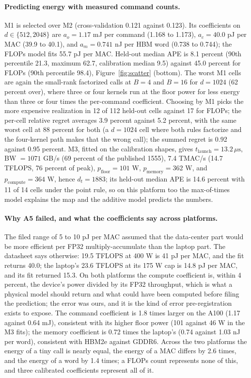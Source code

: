 \documentclass{article}
\newcommand{\us}{\,\mu\mathrm{s}}
\begin{document}
\paragraph{Predicting energy with measured command counts.} M1 is selected over M2 (cross-validation 0.121 against 0.123). Its coefficients on $d \in \{512, 2048\}$ are $a_o = 1.17$ mJ per command (1.168 to 1.173), $a_c = 40.0$ pJ per MAC (39.9 to 40.1), and $a_m = 0.741$ nJ per HBM word (0.738 to 0.744); the FLOPs model fits 55.7 pJ per MAC. Held-out median APE is 8.1 percent (90th percentile 21.3, maximum 62.7, calibration median 9.5) against 45.0 percent for FLOPs (90th percentile 98.4), Figure~\ref{fig:scatter} (bottom). The worst M1 cells are again the small-rank factorized calls at $B = 4$ and $B = 16$ for $d = 1024$ (62 percent over), where three or four kernels run at the floor power for less energy than three or four times the per-command coefficient. Choosing by M1 picks the more expensive realization in 12 of 112 held-out cells against 17 for FLOPs; the per-cell relative regret averages 3.9 percent against 5.2 percent, with the same worst cell at 88 percent for both (a $d = 1024$ cell where both rules factorize and the four-kernel path makes that the wrong call); the summed regret is 0.92 against 0.95 percent. M3, fitted on the calibration shapes, gives $t_{\mathrm{launch}} = 13.2\us$, BW $= 1071$ GB/s (69 percent of the published 1555), 7.4 TMAC/s (14.7 TFLOPS, 76 percent of peak), $p_{\mathrm{floor}} = 101$ W, $p_{\mathrm{memory}} = 362$ W, and $p_{\mathrm{compute}} = 364$ W, hence $d_t = 1883$; its held-out median APE is 14.6 percent with 11 of 14 cells under the point rule, so on this platform too the max-of-times model explains the map and the additive model predicts the numbers.

\paragraph{Why A5 failed, and what the coefficients say across platforms.} The filed range of 5 to 10 pJ per MAC assumed that the data-center part would be more efficient per FP32 multiply-accumulate than the laptop part. The datasheet says otherwise: 19.5 TFLOPS at 400 W is 41 pJ per MAC, and the fit returns 40.0; the laptop's 23.6 TFLOPS at its 175 W cap is 14.8 pJ per MAC, and its fit returned 15.3. On both platforms the compute coefficient is, within 4 percent, the device's power divided by its FP32 throughput, which is what a physical model should return and what could have been computed before filing the prediction; the error was ours, and it is the kind of error pre-registration exists to expose. The command coefficient is 1.8 times larger on the A100 (1.17 against 0.64 mJ), consistent with its higher floor power (101 against 46 W in the M3 fits); the memory coefficient is 0.72 times the laptop's (0.74 against 1.03 nJ per word), consistent with HBM2e against GDDR6. Across the two platforms the energy of a tiny call is nearly equal, the energy of a MAC differs by 2.6 times, and the energy of a word by 1.4 times; a FLOPs count represents none of this, and three calibrated coefficients represent all of it.
\end{document}

